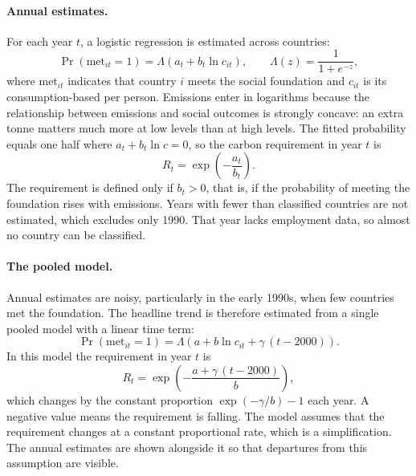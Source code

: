\paragraph{Annual estimates.} For each year $t$, a logistic regression is estimated across countries:
\begin{equation}\label{eq:annual}
\Pr(\text{met}_{it} = 1) = \Lambda\!\left(a_t + b_t \ln c_{it}\right), \qquad \Lambda(z) = \frac{1}{1+e^{-z}},
\end{equation}
where $\text{met}_{it}$ indicates that country $i$ meets the social foundation and $c_{it}$ is its consumption-based \COtwo{} per person. Emissions enter in logarithms because the relationship between emissions and social outcomes is strongly concave: an extra tonne matters much more at low levels than at high levels. The fitted probability equals one half where $a_t + b_t \ln c = 0$, so the carbon requirement in year $t$ is
\begin{equation}
R_t = \exp\!\left(-\frac{a_t}{b_t}\right).
\end{equation}
The requirement is defined only if $b_t > 0$, that is, if the probability of meeting the foundation rises with emissions. Years with fewer than \nMinCross{} classified countries are not estimated, which excludes only 1990. That year lacks employment data, so almost no country can be classified.

\paragraph{The pooled model.} Annual estimates are noisy, particularly in the early 1990s, when few countries met the foundation. The headline trend is therefore estimated from a single pooled model with a linear time term:
\begin{equation}\label{eq:pooled}
\Pr(\text{met}_{it} = 1) = \Lambda\!\left(a + b \ln c_{it} + \gamma\,(t - 2000)\right).
\end{equation}
In this model the requirement in year $t$ is
\begin{equation}
R_t = \exp\!\left(-\frac{a + \gamma\,(t-2000)}{b}\right),
\end{equation}
which changes by the constant proportion $\exp(-\gamma/b) - 1$ each year. A negative value means the requirement is falling. The model assumes that the requirement changes at a constant proportional rate, which is a simplification. The annual estimates are shown alongside it so that departures from this assumption are visible.

